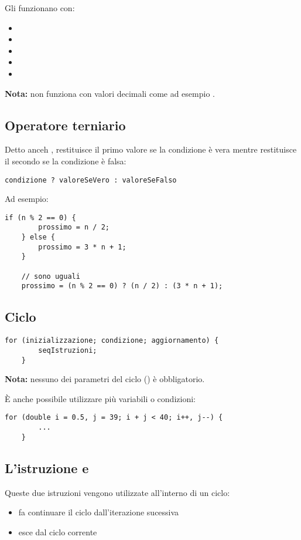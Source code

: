 \documentclass[../main.tex]{subfiles}
\begin{document}
\pagebreak
Gli  funzionano con:
\begin{itemize}
    \item {}
    \item {}
    \item {}
    \item {}
    \item {}
\end{itemize}
\textbf{Nota:} non funziona con valori decimali come ad esempio .

\vspace{0.5cm}
\subsection{Operatore terniario}
Detto anceh , restituisce il primo valore se la condizione è vera mentre restituisce il secondo se la condizione è falsa:
\begin{lstlisting}[style=java]
    condizione ? valoreSeVero : valoreSeFalso
\end{lstlisting}

Ad esempio:
\begin{lstlisting}[style=java]
    if (n % 2 == 0) {
        prossimo = n / 2;
    } else {
        prossimo = 3 * n + 1;
    }

    // sono uguali
    prossimo = (n % 2 == 0) ? (n / 2) : (3 * n + 1);
\end{lstlisting}

\vspace{0.25cm}
\subsection{Ciclo }
\begin{lstlisting}[style=java]
    for (inizializzazione; condizione; aggiornamento) {
        seqIstruzioni;
    }
\end{lstlisting}
\textbf{Nota:} nessuno dei parametri del ciclo  () è obbligatorio.

È anche possibile utilizzare più variabili o condizioni:
\begin{lstlisting}[style=java]
    for (double i = 0.5, j = 39; i + j < 40; i++, j--) {
        ...
    }
\end{lstlisting}

\vspace{0.25cm}
\subsection{L'istruzione  e }
Queste due istruzioni vengono utilizzate all'interno di un ciclo:
\begin{itemize}
    \item {} fa continuare il ciclo dall'iterazione sucessiva
    \item {} esce dal ciclo corrente
\end{itemize}
\end{document}
